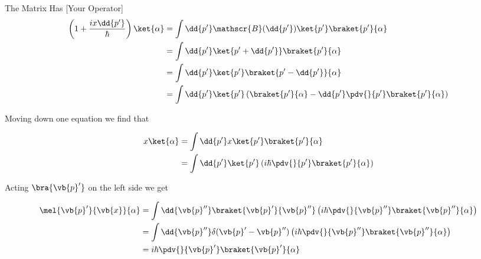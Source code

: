 \begin{answer}
\begin{answerpart}{The Matrix Has [Your Operator]}
    \begin{equation}
      \begin{split}
        \left(1 + \frac{ix\dd{p'}}{\hbar}\right)\ket{\alpha}
        &=
        \int \dd{p'}
        \mathscr{B}(\dd{p'})\ket{p'}\braket{p'}{\alpha}
        \\
        &=
        \int \dd{p'}
        \ket{p' + \dd{p'}}\braket{p'}{\alpha}
        \\
        &=
        \int \dd{p'}
        \ket{p'}\braket{p' -  \dd{p'}}{\alpha}
        \\
        &=
        \int \dd{p'}
        \ket{p'}
        \left(
        \braket{p'}{\alpha} - \dd{p'} \pdv{}{p'}\braket{p'}{\alpha}
        \right)
        \\
      \end{split}
    \end{equation}

    Moving down one equation we find that

    \begin{equation}
      \begin{split}
        x\ket{\alpha}
        &= \int \dd{p'} x \ket{p'}\braket{p'}{\alpha}\\
        &= \int \dd{p'} \ket{p'}
        \left(i\hbar\pdv{}{p'}
        \braket{p'}{\alpha}
        \right)
        \\
      \end{split}
    \end{equation}

    Acting $\bra{\vb{p}'}$ on the left side we get
    
    \begin{equation}
      \begin{split}
        \mel{\vb{p}'}{\vb{x}}{\alpha}
        &= \int \dd{\vb{p}''} \braket{\vb{p}'}{\vb{p}''}
        \left(i\hbar\pdv{}{\vb{p}''}
        \braket{\vb{p}''}{\alpha}
        \right)
        \\
        &= \int \dd{\vb{p}''}
        \delta(\vb{p}'-\vb{p}'')
        \left(i\hbar\pdv{}{\vb{p}''}
        \braket{\vb{p}''}{\alpha}
        \right)
        \\
        &= 
        i\hbar\pdv{}{\vb{p}'}
        \braket{\vb{p}'}{\alpha}
        \\
      \end{split}
    \end{equation}

  \end{answerpart}

\end{answer}
